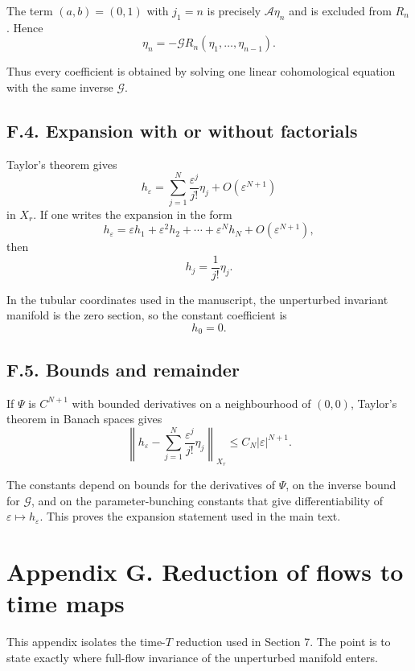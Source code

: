 \documentclass[12pt,a4paper]{article}
\theoremstyle{plain}
\numberwithin{equation}{section}
\numberwithin{theorem}{section}
\begin{document}
The term $(a,b)=(0,1)$ with $j_1=n$ is precisely $\mathcal A\eta_n$ and is excluded from $R_n$. Hence
\[\eta_n
=
-
\mathcal G R_n(\eta_1,
\ldots,
\eta_{n-1}).
\]

Thus every coefficient is obtained by solving one linear cohomological equation with the same inverse $\mathcal G$.

\subsection{F.4. Expansion with or without factorials}

Taylor's theorem gives
\[
h_\varepsilon
=
\sum_{j=1}^{N}
\frac{\varepsilon^j}{j!}
\eta_j
+O(\varepsilon^{N+1})
\]
in $X_r$. If one writes the expansion in the form
\[
h_\varepsilon
=
\varepsilon h_1+
\varepsilon^2 h_2+\cdots+
\varepsilon^N h_N
+O(\varepsilon^{N+1}),
\]
then
\[
h_j=\frac{1}{j!}\eta_j.
\]

In the tubular coordinates used in the manuscript, the unperturbed invariant manifold is the zero section, so the constant coefficient is
\[
h_0=0.
\]

\subsection{F.5. Bounds and remainder}

If $\Psi$ is $C^{N+1}$ with bounded derivatives on a neighbourhood of $(0,0)$, Taylor's theorem in Banach spaces gives
\[
\left\|h_\varepsilon-
\sum_{j=1}^{N}
\frac{\varepsilon^j}{j!}
\eta_j
\right\|_{X_r}
\le
C_N|
\varepsilon|^{N+1}.
\]

The constants depend on bounds for the derivatives of $\Psi$, on the inverse bound for $\mathcal G$, and on the parameter-bunching constants that give differentiability of $\varepsilon\mapsto h_\varepsilon$. This proves the expansion statement used in the main text.

\clearpage

\section{Appendix G. Reduction of flows to time maps}

This appendix isolates the time-$T$ reduction used in Section 7. The point is to state exactly where full-flow invariance of the unperturbed manifold enters.
\end{document}
